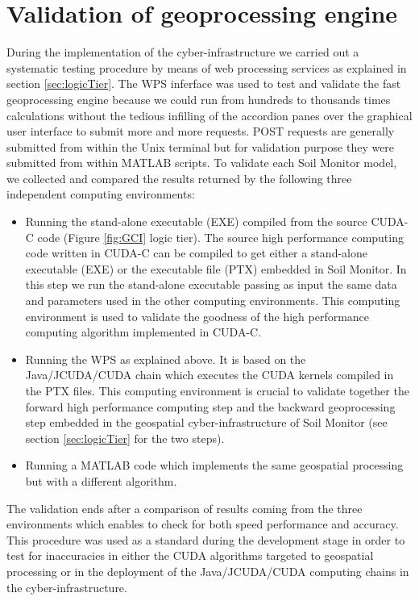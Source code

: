 \documentclass[APA,LATO1COL,doublespace]{WileyNJD-v2}
\begin{document}
\section{Validation of geoprocessing engine}\label{sec:validation}
During the implementation of the 
cyber-infrastructure we carried out a systematic testing procedure by means of web processing services as explained in section \ref{sec:logicTier}.
The WPS inferface was used to test and validate the fast geoprocessing engine because we could run from hundreds to thousands times calculations without the tedious infilling of the accordion panes over the graphical user interface to submit more and more requests.
POST requests are generally submitted from within the Unix terminal but for validation purpose they were submitted from within \mbox{MATLAB\textregistered} scripts. %
To validate each Soil Monitor model, we collected and compared the results returned by the following three independent computing environments:
\begin{itemize}
    \item Running the stand-alone executable (EXE) compiled from the source CUDA-C code (Figure \ref{fig:GCI} logic tier).
    The source high performance computing code written in CUDA-C can be compiled to get either a stand-alone executable (EXE) or the executable file (PTX) embedded in Soil Monitor.
    In this step we run the stand-alone executable passing as input the same data and parameters used in the other computing environments.
    This computing environment is used to validate the goodness of the high performance computing algorithm implemented in CUDA-C.
    
    \item Running the WPS as explained above.
    It is based on the Java/JCUDA/CUDA chain which executes the CUDA kernels compiled in the PTX files. This computing environment is crucial to validate together the forward high performance computing step and the backward geoprocessing step embedded in the geospatial cyber-infrastructure of Soil Monitor (see section \ref{sec:logicTier} for the two steps). 
    
    \item Running a \mbox{MATLAB\textregistered} code which implements the same geospatial processing but with a different algorithm.
\end{itemize}

The validation ends after a comparison of results coming from the three environments which enables to check for both speed performance and accuracy. 
This procedure was used as a standard during the development stage in order to test for inaccuracies in either the CUDA algorithms targeted to geospatial processing or in the deployment of the Java/JCUDA/CUDA computing chains in the cyber-infrastructure.
\end{document}
